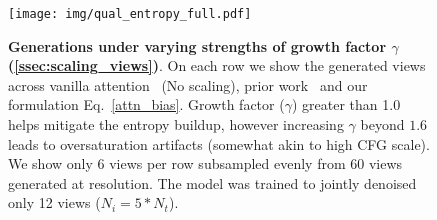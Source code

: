 \begin{figure}[h!]
    \centering    
    \hspace{-0.5cm}
    \texttt{[image: img/qual\_entropy\_full.pdf]}
    \vspace{-0.2cm}
    \caption{{\textbf{Generations under varying strengths of growth factor $\gamma$ (\cref{ssec:scaling_views})}. On each row we show the generated views across vanilla attention~\cite{vaswani2017attention} (No scaling), prior work~\cite{jin2023training} and our formulation Eq.~\eqref{attn_bias}. Growth factor ($\gamma$) greater than 1.0 helps mitigate the entropy buildup, however increasing $\gamma$ beyond $1.6$ leads to oversaturation artifacts (somewhat akin to high CFG scale). We show only 6 views per row subsampled evenly from 60 views generated at \resthree resolution. The model was trained to jointly denoised only 12 views ($N_i = 5*N_t$).}}
    \label{fig:qual_entropy_full}
\end{figure}

